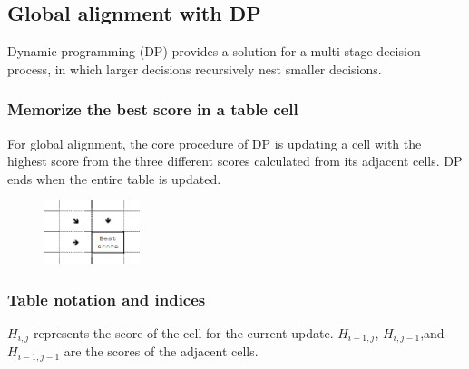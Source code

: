 %
%

%
%
\subsection{Global alignment with DP}
Dynamic programming (DP) provides a solution for a multi-stage decision process, in which larger decisions recursively nest smaller decisions.

\subsubsection*{Memorize the best score in a table cell}

For global alignment, the core procedure of DP is updating a cell with the highest score from the three different scores calculated from its adjacent cells. DP ends when the entire table is updated.

\begin{figure}[H]
  \centering
      \includegraphics[width=0.25\textwidth]{fig02/dynamic_programmoing_cell_update.png}
\end{figure}

%
%	
\subsubsection*{Table notation and indices}
$H_{i,j}$ represents the score of the cell for the current update. $H_{i-1,j}$, $H_{i,j-1}$,and $H_{i-1,j-1}$ are the scores of the adjacent cells.

